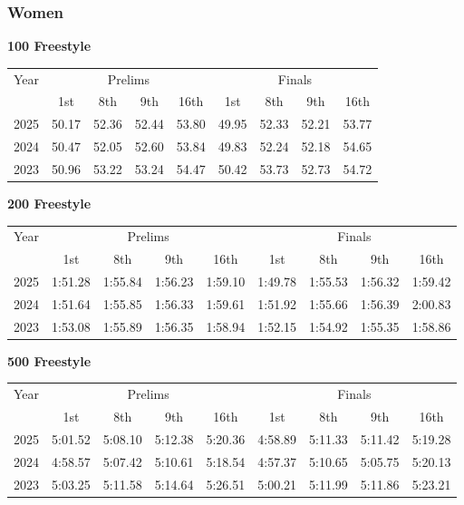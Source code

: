 \subsubsection{Women}

\textbf{100 Freestyle}

\begin{flushleft}
\begin{tabular}{|c|c|c|c|c|c|c|c|c|}
\hline
Year & \multicolumn{4}{c|}{Prelims} & \multicolumn{4}{c|}{Finals} \\
\cline{2-9}
& 1st & 8th & 9th & 16th & 1st & 8th & 9th & 16th \\
\hline
2025 & 50.17 & 52.36 & 52.44 & 53.80 & 49.95 & 52.33 & 52.21 & 53.77 \\
2024 & 50.47 & 52.05 & 52.60 & 53.84 & 49.83  & 52.24 & 52.18  & 54.65  \\
2023 & 50.96 & 53.22 & 53.24 & 54.47 & 50.42 & 53.73 & 52.73 & 54.72 \\
\hline
\end{tabular}
\end{flushleft}

\textbf{200 Freestyle}

\begin{flushleft}
\begin{tabular}{|c|c|c|c|c|c|c|c|c|}
\hline
Year & \multicolumn{4}{c|}{Prelims} & \multicolumn{4}{c|}{Finals} \\
\cline{2-9}
& 1st & 8th & 9th & 16th & 1st & 8th & 9th & 16th \\
\hline
2025 & 1:51.28 & 1:55.84 & 1:56.23 & 1:59.10 & 1:49.78 & 1:55.53 & 1:56.32 & 1:59.42 \\
2024 & 1:51.64 & 1:55.85 & 1:56.33 & 1:59.61 & 1:51.92 & 1:55.66 & 1:56.39 & 2:00.83 \\
2023 & 1:53.08 & 1:55.89 & 1:56.35 & 1:58.94 & 1:52.15 & 1:54.92 & 1:55.35 & 1:58.86 \\
\hline
\end{tabular}
\end{flushleft}

\textbf{500 Freestyle}

\begin{flushleft}
\begin{tabular}{|c|c|c|c|c|c|c|c|c|}
\hline
Year & \multicolumn{4}{c|}{Prelims} & \multicolumn{4}{c|}{Finals} \\
\cline{2-9}
& 1st & 8th & 9th & 16th & 1st & 8th & 9th & 16th \\
\hline
2025 & 5:01.52 & 5:08.10 & 5:12.38 & 5:20.36 & 4:58.89 & 5:11.33 & 5:11.42 & 5:19.28 \\
2024 & 4:58.57 & 5:07.42 & 5:10.61 & 5:18.54 & 4:57.37 & 5:10.65 & 5:05.75 & 5:20.13 \\
2023 & 5:03.25 & 5:11.58 & 5:14.64 & 5:26.51 & 5:00.21 & 5:11.99 & 5:11.86 & 5:23.21 \\
\hline
\end{tabular}
\end{flushleft}

